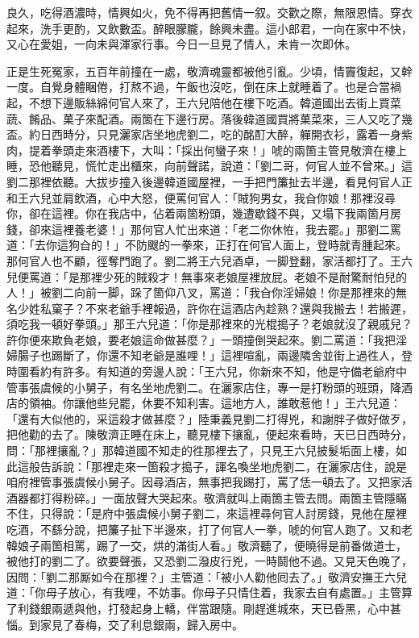 良久，吃得酒濃時，情興如火，免不得再把舊情一叙。交歡之際，無限恩情。穿衣起來，洗手更酌，又飲數盃。醉眼朦朧，餘興未盡。這小郎君，一向在家中不快，又心在愛姐，一向未與渾家行事。今日一旦見了情人，未肯一次即休。

正是生死冤家，五百年前撞在一處，敬濟魂靈都被他引亂。少頃，情竇復起，又幹一度。自覺身體睏倦，打熬不過，午飯也沒吃，倒在床上就睡着了。也是合當禍起，不想下邊販絲綿何官人來了，王六兒陪他在樓下吃酒。韓道國出去街上買菜蔬、餚品、菓子來配酒。兩箇在下邊行房。落後韓道國買將菓菜來，三人又吃了幾盃。約日西時分，只見灑家店坐地虎劉二，吃的酩酊大醉，軃開衣衫，露着一身紫肉，提着拳頭走來酒樓下，大叫：「採出何蠻子來！」唬的兩箇主管見敬濟在樓上睡，恐他聽見，慌忙走出櫃來，向前聲諾，說道：「劉二哥，何官人並不曾來。」這劉二那裡依聽。大拔步撞入後邊韓道國屋裡，一手把門簾扯去半邊，看見何官人正和王六兒並肩飲酒，心中大怒，便罵何官人：「賊狗男女，我㒲你娘！那裡沒尋你，卻在這裡。你在我店中，佔着兩箇粉頭，幾遭歇錢不與，又塌下我兩箇月房錢，卻來這裡養老婆！」{}那何官人忙出來道：「老二你休恠，我去罷。」那劉二罵道：「去你這狗㒲的！」不防颼的一拳來，正打在何官人面上，登時就青腫起來。那何官人也不顧，徑奪門跑了。劉二將王六兒酒卓，一脚登翻，家活都打了。王六兒便罵道：「是那裡少死的賊殺才！無事來老娘屋裡放屁。老娘不是耐驚耐怕兒的人！」{}被劉二向前一脚，跺了箇仰八叉，罵道：「我㒲你淫婦娘！你是那裡來的無名少姓私窠子？不來老爺手裡報過，許你在這酒店內趁熟？還與我搬去！若搬遲，須吃我一頓好拳頭。」那王六兒道：「你是那裡來的光棍搗子？老娘就沒了親戚兒？許你便來欺負老娘，要老娘這命做甚麼？」一頭撞倒哭起來。劉二罵道：「我把淫婦腸子也踢斷了，你還不知老爺是誰哩！」這裡喧亂，兩邊隣舍並街上過徃人，登時圍看約有許多。有知道的旁邊人說：「王六兒，你新來不知，他是守備老爺府中管事張虞候的小舅子，有名坐地虎劉二。在灑家店住，專一是打粉頭的班頭，降酒店的領袖。你讓他些兒罷，休要不知利害。這地方人，誰敢惹他！」王六兒道：「還有大似他的，采這殺才做甚麼？」陸秉義見劉二打得兇，和謝胖子做好做歹，把他勸的去了。陳敬濟正睡在床上，聽見樓下攘亂，便起來看時，天已日西時分，問：「那裡攘亂？」那韓道國不知走的徃那裡去了，只見王六兒披髮垢面上樓，如此這般告訴說：「那裡走來一箇殺才搗子，諢名喚坐地虎劉二，在灑家店住，說是咱府裡管事張虞候小舅子。因尋酒店，無事把我踢打，罵了恁一頓去了。又把家活酒器都打得粉碎。」一面放聲大哭起來。敬濟就叫上兩箇主管去問。兩箇主管隱瞞不住，只得說：「是府中張虞候小舅子劉二，來這裡尋何官人討房錢，見他在屋裡吃酒，不繇分說，把簾子扯下半邊來，打了何官人一拳，唬的何官人跑了。又和老韓娘子兩箇相罵，踢了一交，烘的滿街人看。」敬濟聽了，便曉得是前番做道士，被他打的劉二了。欲要聲張，又恐劉二潑皮行兇，一時鬪他不過。又見天色晚了，因問：「劉二那厮如今在那裡？」主管道：「被小人勸他囘去了。」敬濟安撫王六兒道：「你母子放心，有我哩，不妨事。你母子只情住着，我家去自有處置。」主管算了利錢銀兩遞與他，打發起身上轎，伴當跟隨。剛趕進城來，天已昏黑，心中甚惱。到家見了春梅，交了利息銀兩，歸入房中。

